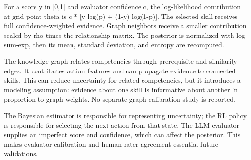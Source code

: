 \documentclass{ieeeaccess}
\begin{document}
For a score y in [0,1] and evaluator confidence c, the log-likelihood contribution at grid point theta is c * [y log(p) + (1-y) log(1-p)]. The selected skill receives full confidence-weighted evidence. Graph neighbors receive a smaller contribution scaled by rho times the relationship matrix. The posterior is normalized with log-sum-exp, then its mean, standard deviation, and entropy are recomputed.

The knowledge graph relates competencies through prerequisite and similarity edges. It contributes action features and can propagate evidence to connected skills. This can reduce uncertainty for related competencies, but it introduces a modeling assumption: evidence about one skill is informative about another in proportion to graph weights. No separate graph calibration study is reported.

The Bayesian estimator is responsible for representing uncertainty; the RL policy is responsible for selecting the next action from that state. The LLM evaluator supplies an imperfect score and confidence, which can affect the posterior. This makes evaluator calibration and human-rater agreement essential future validations.

\begin{table}[t]\centering\small

\caption{Table 2. Inference components and roles}


\end{table}
\end{document}
